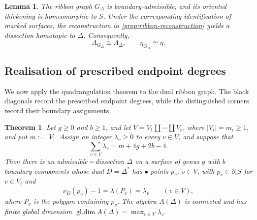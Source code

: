 \documentclass[11pt]{amsart}
\theoremstyle{definition}
\theoremstyle{plain}
\newtheorem{theorem}{Theorem}[section]
\newtheorem{lemma}[lemma]{Lemma}
\theoremstyle{definition}
\theoremstyle{definition}
\newcommand{\gldim}{\operatorname{gl.dim}}
\begin{document}
\begin{lemma}
\label{lem:polygon-dual-reconstruction}
The ribbon graph $G_\Delta$ is boundary-admissible, and its
oriented thickening is homeomorphic to $S$. Under the
corresponding identification of marked surfaces, the
reconstruction in \cref{prop:ribbon-reconstruction} yields
a dissection homotopic to $\Delta$. Consequently,
\begin{equation}
\label{eq:dual-reconstruction-algebra}
  A_{G_\Delta}\cong A_\Delta,
  \qquad
  \eta_{G_\Delta}\simeq\eta.
\end{equation}
\end{lemma}


\subsection{Realisation of prescribed endpoint degrees}

We now apply the quadrangulation theorem to the dual ribbon graph.
The black diagonals record the prescribed endpoint degrees, while the
distinguished corners record their boundary assignments.


\begin{theorem}
\label{thm:all-genus-realization}
Let $g\geq0$ and $b\geq1$, and let
$V=V_1\amalg\cdots\amalg V_b$, where $|V_i|=m_i\geq1$, and put
$m:=|V|$.  Assign an integer $\lambda_v\geq0$ to every $v\in V$, and suppose
that
\begin{equation}
\label{eq:all-genus-Euler-condition}
 \sum_{v\in V}\lambda_v=m+4g+2b-4.
\end{equation}
Then there is an admissible $\circ$-dissection $\Delta$ on a surface of
genus $g$ with $b$ boundary components whose dual $D=\Delta^*$ has
$\bullet$-points $p_v$, $v\in V$, with $p_v\in\partial_iS$ for $v\in V_i$
and
\begin{equation}
\label{eq:realised-lambda}
 \nu_D(p_v)-1=\lambda(P_v)=\lambda_v\qquad(v\in V),
\end{equation}
where $P_v$ is the polygon containing $p_v$.  The algebra $A(\Delta)$
is connected and has finite global dimension
$\gldim A(\Delta)=\max_{v\in V}\lambda_v$.
\end{theorem}
\end{document}
